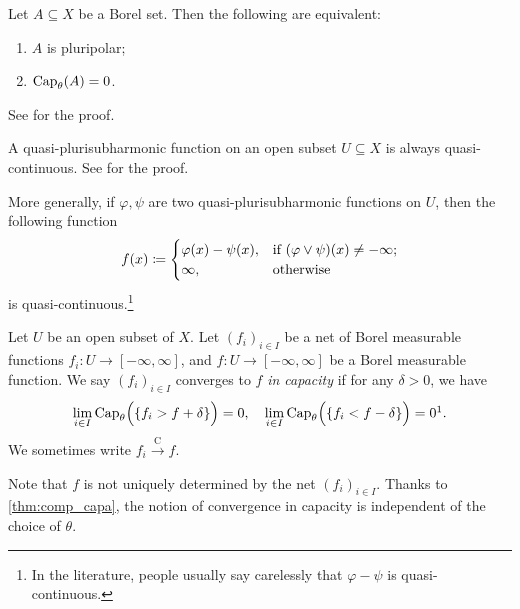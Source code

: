 \begin{theorem}\label{thm:pp_cap}
    Let $A\subseteq X$ be a Borel set. Then the following are equivalent:
    \begin{enumerate}
        \item\label{itm:thm:pp_cap:1} $A$ is pluripolar;
        \item\label{itm:thm:pp_cap:2} $\operatorname{Cap}_{\theta}(A)=0$.
    \end{enumerate}
\end{theorem}
See \cite[Theorem~4.40]{GZ17} for the proof.


\begin{example}\label{ex:psh_qc}
    A quasi-plurisubharmonic function on an open subset $U\subseteq X$ is always quasi-continuous. See \cite[Theorem~4.20]{GZ17} for the proof.

    More generally, if $\varphi,\psi$ are two quasi-plurisubharmonic functions on $U$, then the following function
    \[
    f(x)\coloneqq \begin{cases}
        \varphi(x)-\psi(x),&\textup{if }(\varphi\lor \psi)(x)\neq -\infty;\\
        \infty,&\textup{otherwise}
    \end{cases}
    \]
    is quasi-continuous.\footnote{In the literature, people usually say carelessly that $\varphi-\psi$ is quasi-continuous.}
\end{example}

\begin{definition}\label{def:conv_cap}
Let $U$ be an open subset of $X$.
    Let $(f_i)_{i\in I}$ be a net of Borel measurable functions $f_i\colon U\rightarrow [-\infty,\infty]$, and $f\colon U\rightarrow [-\infty,\infty]$ be a Borel measurable function. We say $(f_i)_{i\in I}$ converges to $f$ \emph{in capacity} if for any $\delta>0$, we have
    \[
        \lim_{i\in I} \Capa_{\theta}\Bigl( \{f_i>f+\delta\} \Bigr)=0,\quad \lim_{i\in I} \Capa_{\theta}\Bigl( \{f_i<f-\delta\} \Bigr)=0\footnotemark.
    \]
    We sometimes write $f_i\xrightarrow{\mathrm{C}} f$.
\end{definition}
Note that $f$ is not uniquely determined by the net $(f_i)_{i\in I}$. Thanks to \cref{thm:comp_capa}, the notion of convergence in capacity is independent of the choice of $\theta$.

